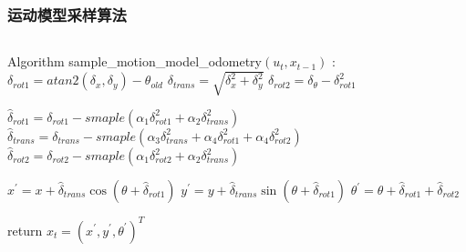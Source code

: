 \begin{comment}
1.算法将初始位姿和里程计读数作为输入；
2.运动模型的三个动作序列
\end{comment}
\begin{frame}[fragile]
  \frametitle{运动模型采样算法}

    \begin{columns}
    \begin{block}
      
    
    \begin{algorithmic}[1]
        \State Algorithm sample\_motion\_model\_odometry$(u_t, x_{t-1})$ :
        \State $\delta_{rot1} = atan2(\delta_x, \delta_y) - \theta_{old}$
        \State $\delta_{trans} = \sqrt{\delta_x^2 + \delta_y^2}$
        \State $\delta_{rot2} = \delta_\theta - \delta_{rot1}^2$

        \State $\hat{\delta}_{rot1} = \delta_{rot1} - smaple(\alpha_1 \delta_{rot1}^2 + \alpha_2 \delta_{trans}^2)$
        \State $\hat{\delta}_{trans} = \delta_{trans} - smaple(\alpha_3 \delta_{trans}^2 + \alpha_4 \delta_{rot1}^2 + \alpha_4 \delta_{rot2}^2)$
        \State $\hat{\delta}_{rot2} = \delta_{rot2} - smaple(\alpha_1 \delta_{rot2}^2 + \alpha_2 \delta_{trans}^2)$

        \State $x^\prime = x + \hat{\delta}_{trans} \cos(\theta + \hat{\delta}_{rot1})$
        \State $y^\prime = y + \hat{\delta}_{trans} \sin(\theta + \hat{\delta}_{rot1})$
        \State $\theta^\prime = \theta + \hat{\delta}_{rot1}  + \hat{\delta}_{rot2}$

        \State return $x_t = (x^\prime, y^\prime, \theta^\prime)^T$

    \end{algorithmic}
  \end{block}


  \end{columns}

\end{frame}






\begin{comment}
旋转分量中的旋转噪声;
平移分量中的旋转噪声；
平移分量中的平移噪声；
旋转分量中的平移噪声；
1.
\end{comment}

